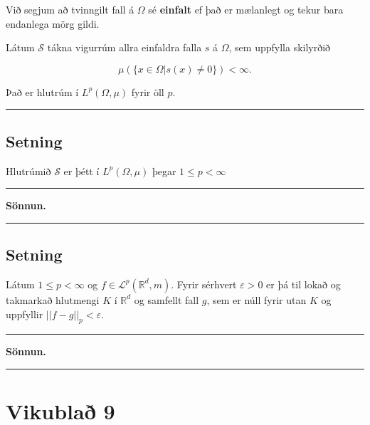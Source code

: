 \documentclass[]{book}
\begin{document}
Við segjum að tvinngilt fall á \(\Omega\) sé \textbf{einfalt} ef það er mælanlegt og tekur bara endanlega mörg gildi.

Látum \(\mathcal S\) tákna vigurrúm allra einfaldra falla \(s\) á \(\Omega\), sem uppfylla skilyrðið

\[
\mu(\{x\in\Omega|s(x)\neq 0\}) < \infty.
\]

Það er hlutrúm í \(L^p(\Omega,\mu)\) fyrir öll \(p\).

\begin{center}\rule{0.5\linewidth}{\linethickness}\end{center}

\hypertarget{setning-73}{%
\section*{Setning}\label{setning-73}}

Hlutrúmið \(\mathcal S\) er þétt í \(L^p(\Omega,\mu)\) þegar \(1\leq p< \infty\)

\begin{center}\rule{0.5\linewidth}{\linethickness}\end{center}

\textbf{Sönnun.}

\begin{center}\rule{0.5\linewidth}{\linethickness}\end{center}

\hypertarget{setning-74}{%
\section*{Setning}\label{setning-74}}

Látum \(1\leq p < \infty\) og \(f\in\mathcal L^p(\mathbb R^d,m)\). Fyrir sérhvert \(\varepsilon > 0\) er þá til lokað og takmarkað hlutmengi \(K\) í \(\mathbb R^d\) og samfellt fall \(g\), sem er núll fyrir utan \(K\) og uppfyllir \(||f-g||_p < \varepsilon\).

\begin{center}\rule{0.5\linewidth}{\linethickness}\end{center}

\textbf{Sönnun.}

\begin{center}\rule{0.5\linewidth}{\linethickness}\end{center}

\hypertarget{vikubla-9}{%
\chapter*{Vikublað 9}\label{vikubla-9}}
\end{document}
